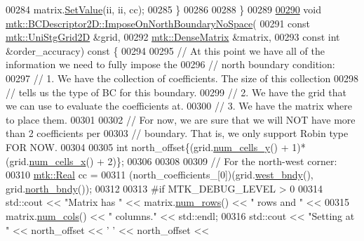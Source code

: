 \begin{DoxyCode}
00284     matrix.\hyperlink{classmtk_1_1DenseMatrix_a784ce5784109ac86bfb9d8562b334b13}{SetValue}(ii, ii, cc);
00285   \}
00286 
00288 \}
00289 
\hypertarget{mtk__bc__descriptor__2d_8cc_source_l00290}{}\hyperlink{classmtk_1_1BCDescriptor2D_a5e7d4b9deba6c07170e983eb1c0e9776}{00290} \textcolor{keywordtype}{void} \hyperlink{classmtk_1_1BCDescriptor2D_a5e7d4b9deba6c07170e983eb1c0e9776}{mtk::BCDescriptor2D::ImposeOnNorthBoundaryNoSpace}(
00291     \textcolor{keyword}{const} \hyperlink{classmtk_1_1UniStgGrid2D}{mtk::UniStgGrid2D} &grid,
00292     \hyperlink{classmtk_1_1DenseMatrix}{mtk::DenseMatrix} &matrix,
00293     \textcolor{keyword}{const} \textcolor{keywordtype}{int} &order\_accuracy)\textcolor{keyword}{ const }\{
00294 
00295   \textcolor{comment}{// At this point we have all of the information we need to fully impose the}
00296   \textcolor{comment}{// north boundary condition:}
00297   \textcolor{comment}{// 1. We have the collection of coefficients. The size of this collection}
00298   \textcolor{comment}{// tells us the type of BC for this boundary.}
00299   \textcolor{comment}{// 2. We have the grid that we can use to evaluate the coefficients at.}
00300   \textcolor{comment}{// 3. We have the matrix where to place them.}
00301 
00302   \textcolor{comment}{// For now, we are sure that we will NOT have more than 2 coefficients per}
00303   \textcolor{comment}{// boundary. That is, we only support Robin type FOR NOW.}
00304 
00305   \textcolor{keywordtype}{int} north\_offset\{(grid.\hyperlink{classmtk_1_1UniStgGrid2D_aed05a801cc9a76dba0ff203cea58a61a}{num\_cells\_y}() + 1)*(grid.\hyperlink{classmtk_1_1UniStgGrid2D_a2d182866a398aba8e4829590e85bf939}{num\_cells\_x}() + 2)\};
00306 
00308 
00309   \textcolor{comment}{// For the north-west corner:}
00310   \hyperlink{group__c01-roots_gac080bbbf5cbb5502c9f00405f894857d}{mtk::Real} cc =
00311     (north\_coefficients\_[0])(grid.\hyperlink{classmtk_1_1UniStgGrid2D_af2b1712387ded85edaf2b64617d3fc13}{west\_bndy}(), grid.\hyperlink{classmtk_1_1UniStgGrid2D_afe1ead253cdeb5503e0489eba8fd84e2}{north\_bndy}());
00312 
00313 \textcolor{preprocessor}{  #if MTK\_DEBUG\_LEVEL > 0}
00314   std::cout << \textcolor{stringliteral}{"Matrix has "} << matrix.\hyperlink{classmtk_1_1DenseMatrix_a53f3afb3b6a8d21854458aaa9663cc74}{num\_rows}() << \textcolor{stringliteral}{" rows and "} <<
00315     matrix.\hyperlink{classmtk_1_1DenseMatrix_a41747502d468c6728a4be31501b16e0e}{num\_cols}() << \textcolor{stringliteral}{" columns."} << std::endl;
00316   std::cout << \textcolor{stringliteral}{"Setting at "} << north\_offset << \textcolor{charliteral}{' '} << north\_offset <<

\end{DoxyCode}
